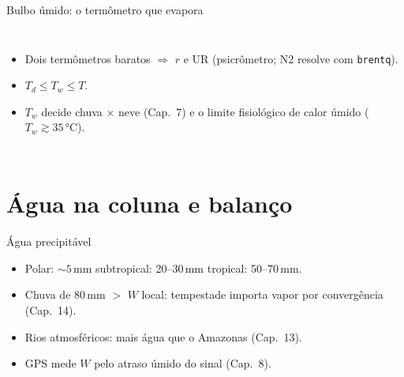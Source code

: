 \documentclass[aspectratio=169,11pt]{beamer}
\begin{document}
\begin{frame}{Bulbo úmido: o termômetro que evapora}
  \begin{columns}
    \vspace{0.4em}
    \begin{itemize}
      \item Dois termômetros baratos $\Rightarrow$ $r$ e UR
            (psicrômetro; N2 resolve com \texttt{brentq}).
      \item $T_d \le T_w \le T$.
      \item $T_w$ decide chuva × neve (Cap.~7) e o limite fisiológico
            de calor úmido ($T_w \gtrsim 35\,°$C).
    \end{itemize}
  \end{columns}
\end{frame}

\section{Água na coluna e balanço}

\begin{frame}{Água precipitável}
  \vspace{0.5em}
  \begin{itemize}
    \item Polar: $\sim5$\,mm \quad subtropical: 20--30\,mm \quad
          tropical: 50--70\,mm.
    \item Chuva de 80\,mm $>$ $W$ local: tempestade \alert{importa}
          vapor por convergência (Cap.~14).
    \item Rios atmosféricos: mais água que o Amazonas (Cap.~13).
    \item GPS mede $W$ pelo atraso úmido do sinal (Cap.~8).
  \end{itemize}
\end{frame}
\end{document}
